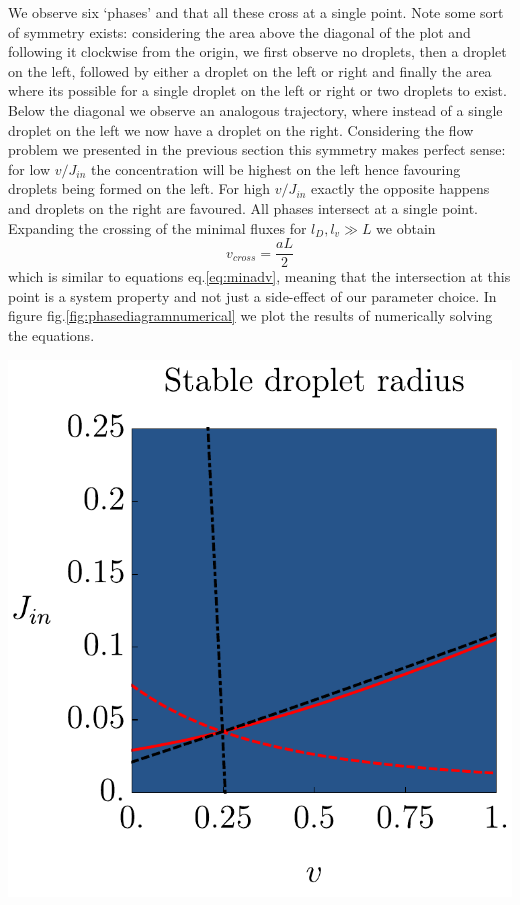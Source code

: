 \documentclass{Dissertate}
\let\origfigure\figure
\let\endorigfigure\endfigure
\renewenvironment{figure}[1][2] {
    \expandafter\origfigure\expandafter[H]
} {
    \endorigfigure
}
\begin{document}
We observe six `phases' and that all these cross at a single point. Note
some sort of symmetry exists: considering the area above the diagonal of
the plot and following it clockwise from the origin, we first observe no
droplets, then a droplet on the left, followed by either a droplet on
the left or right and finally the area where its possible for a single
droplet on the left or right or two droplets to exist. Below the
diagonal we observe an analogous trajectory, where instead of a single
droplet on the left we now have a droplet on the right. Considering the
flow problem we presented in the previous section this symmetry makes
perfect sense: for low \(v/J_{in}\) the concentration will be highest on
the left hence favouring droplets being formed on the left. For high
\(v/J_{in}\) exactly the opposite happens and droplets on the right are
favoured. All phases intersect at a single point. Expanding the crossing
of the minimal fluxes for \(l_D,l_v\gg L\) we obtain \[
v_{cross}=\frac{aL}{2}
\] which is similar to equations eq.\ref{eq:minadv}, meaning that the
intersection at this point is a system property and not just a
side-effect of our parameter choice. In figure
fig.\ref{fig:phasediagramnumerical} we plot the results of numerically
solving the equations.

\begin{figure}
\hypertarget{fig:phasediagramnumerical}{%
\centering
\includegraphics{source/figures/pdf/Numericalphase.pdf}
\caption{Caption.}\label{fig:phasediagramnumerical}
}
\end{figure}
\end{document}
